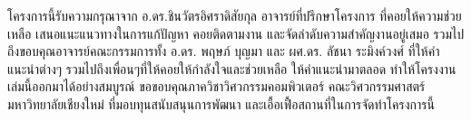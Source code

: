    \iffalse
      \begin{dedication}
         This document is dedicated to all Chiang Mai University students.

         Dedication page is optional.
      \end{dedication}
   \fi %

   \begin{acknowledgments}
           โครงการนี้รับความกรุณาจาก อ.ดร.ชินวัตรอิศราดิสัยกุล อาจารย์ที่ปรึกษาโครงการ
      ที่คอยให้ความช่วยเหลือ เสนอแนะแนวทางในการแก้ปัญหา คอยติดตามงาน และจัดลําดับความสําคัญงานอยู่เสมอ
      รวมไปถึงขอบคุณอาจารย์คณะกรรมการทั้ง อ.ดร. พฤษภ์ บุญมา และ ผศ.ดร. ลัชนา ระมิงค์วงศ์ ที่ให้คำแนะนำต่างๆ รวมไปถึงเพื่อนๆที่ให้คอยให้กำลังใจและช่วยเหลือ ให้คำแนะนำมาตลอด
      ทำให้โครงงานเล่มนี้ออกมาได้อย่างสมบูรณ์ 
      ขอขอบคุณภาควิชาวิศวกรรมคอมพิวเตอร์ คณะวิศวกรรมศาสตร์ มหาวิทยาลัยเชียงใหม่ ที่มอบทุนสนับสนุนการพัฒนา และเอื้อเฟื้อสถานที่ในการจัดทําโครงการนี้
   \end{acknowledgments}%
\fi %

\contentspage

\ifproject
   \figurelistpage %

   \tablelistpage  %
\fi %




